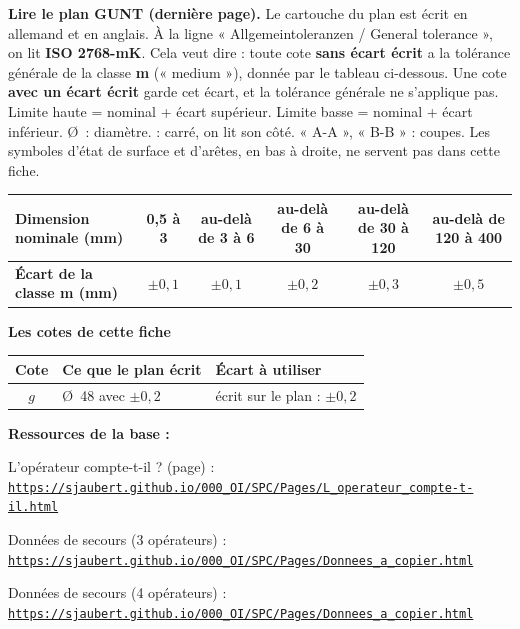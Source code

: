 \documentclass[10pt,a4paper]{article}
\begin{document}
\begin{tcolorbox}[boite,left=5pt,right=5pt,top=3pt,bottom=3pt]\footnotesize
\textbf{\color{uimm}Lire le plan GUNT (dernière page).} Le cartouche du plan est écrit en allemand et en anglais. À la ligne « Allgemeintoleranzen / General tolerance », on lit \textbf{ISO 2768-mK}. Cela veut dire : toute cote \textbf{sans écart écrit} a la tolérance générale de la classe \textbf{m} (« medium »), donnée par le tableau ci-dessous. Une cote \textbf{avec un écart écrit} garde cet écart, et la tolérance générale ne s'applique pas. Limite haute = nominal + écart supérieur. Limite basse = nominal + écart inférieur. \O\ : diamètre. \carre{} : carré, on lit son côté. « A-A », « B-B » : coupes. Les symboles d'état de surface et d'arêtes, en bas à droite, ne servent pas dans cette fiche.
\par\vspace{6pt}\noindent\renewcommand{\arraystretch}{1.2}\setlength{\tabcolsep}{4pt}
\begin{tabular}{|l|c|c|c|c|c|}\hline
\textbf{Dimension nominale (mm)} & 0,5 à 3 & au-delà de 3 à 6 & au-delà de 6 à 30 & au-delà de 30 à 120 & au-delà de 120 à 400\\\hline
\textbf{Écart de la classe m (mm)} & $\pm 0{,}1$ & $\pm 0{,}1$ & $\pm 0{,}2$ & $\pm 0{,}3$ & $\pm 0{,}5$\\\hline
\end{tabular}
\par\vspace{1pt}{\scriptsize Source : ISO 2768-1:1989, tolérances générales des dimensions linéaires, reprises dans la fiche GUNT « PT105f Tolérances ».}
\par\vspace{4pt}\textbf{Les cotes de cette fiche}\par\vspace{2pt}
\begin{tabularx}{\linewidth}{|c|>{\raggedright\arraybackslash}X|>{\raggedright\arraybackslash}X|}\hline
\textbf{Cote} & \textbf{Ce que le plan écrit} & \textbf{Écart à utiliser}\\\hline
$g$ & \O\ 48 avec $\pm 0{,}2$ & écrit sur le plan : $\pm 0{,}2$ \\\hline
\end{tabularx}
\end{tcolorbox}
\vfill{\footnotesize\color{uimm}\textbf{Ressources de la base :}\par L'opérateur compte-t-il ? (page) : \href{https://sjaubert.github.io/000_OI/SPC/Pages/L_operateur_compte-t-il.html}{\nolinkurl{https://sjaubert.github.io/000_OI/SPC/Pages/L_operateur_compte-t-il.html}}\par Données de secours (3 opérateurs) : \href{https://sjaubert.github.io/000_OI/SPC/Pages/Donnees_a_copier.html\#rrarbres}{\nolinkurl{https://sjaubert.github.io/000_OI/SPC/Pages/Donnees_a_copier.html}}\par Données de secours (4 opérateurs) : \href{https://sjaubert.github.io/000_OI/SPC/Pages/Donnees_a_copier.html\#rrarbres4}{\nolinkurl{https://sjaubert.github.io/000_OI/SPC/Pages/Donnees_a_copier.html}}}
\end{document}
